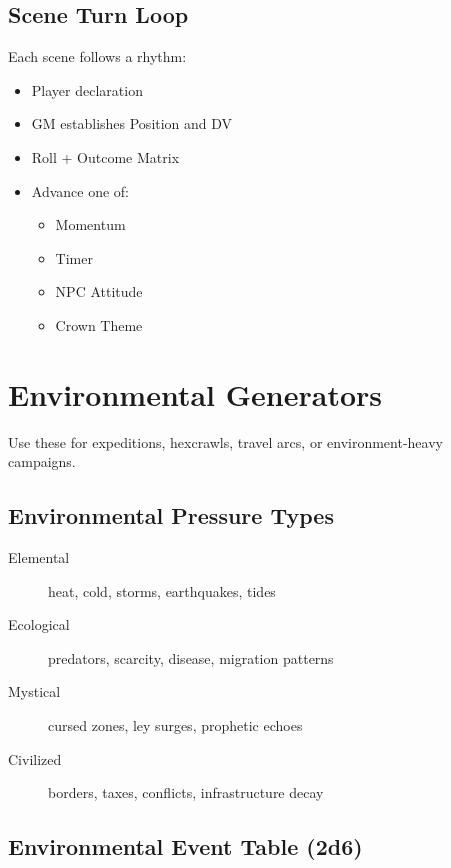 \documentclass[11pt]{article}
\begin{document}
\subsection{Scene Turn Loop}

Each scene follows a rhythm:
\begin{itemize}
    \item Player declaration
    \item GM establishes Position and DV
    \item Roll + Outcome Matrix
    \item Advance one of:
    \begin{itemize}
        \item Momentum
        \item Timer 
        \item NPC Attitude
        \item Crown Theme
    \end{itemize}
\end{itemize}


\section{Environmental Generators}
\label{appendix:environment}

Use these for expeditions, hexcrawls, travel arcs, or environment-heavy campaigns.

\subsection{Environmental Pressure Types}

\begin{description}
    \item[Elemental] heat, cold, storms, earthquakes, tides
    \item[Ecological] predators, scarcity, disease, migration patterns
    \item[Mystical] cursed zones, ley surges, prophetic echoes
    \item[Civilized] borders, taxes, conflicts, infrastructure decay
\end{description}

\subsection{Environmental Event Table (2d6)}
\end{document}
